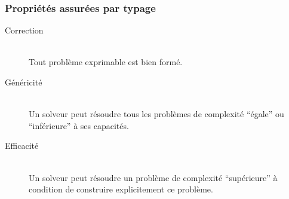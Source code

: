 \documentclass[14pt,utf8,hyperref={pdfpagelabels=false}]{beamer}
\begin{document}
\begin{slideDecision}
  \begin{changeleftmargin}{1.1cm}
    \frametitle{Propriétés assurées par typage}


    \begin{center}
      \begin{description}
        \item[Correction]~\\
          Tout problème exprimable est bien formé.

        \item[Généricité]~\\
          Un solveur peut résoudre tous les problèmes de complexité
          ``égale'' ou ``inférieure'' à ses capacités.

        \item[Efficacité]~\\
          Un solveur peut résoudre un problème de complexité
          ``supérieure'' à condition de construire explicitement ce
          problème.
      \end{description}
    \end{center}
  \end{changeleftmargin}
\end{slideDecision}
\end{document}
